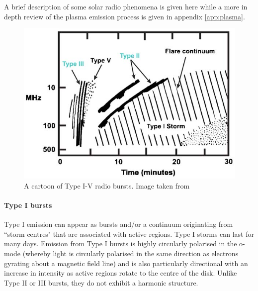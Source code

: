 
A brief description of some solar radio phenomena is given here while a more in depth review of the plasma emission process is given in appendix \ref{app:plasma}.
\begin{figure}
    \centering
    \includegraphics[width=0.75\columnwidth]{Images/Burst_cartoon.jpg}
    \caption[Cartoon of Type I-V radio bursts]{A cartoon of Type I-V radio bursts. Image taken from \cite{Cliver2009}}
    \label{fig:burst_cartoon}
\end{figure}
\paragraph{Type I bursts}
Type I emission can appear as bursts and/or a continuum originating from ``storm centres" that are associated with active regions. Type I storms can last for many days. Emission from Type I bursts is highly circularly polarised in the o-mode (whereby light is circularly polarised in the same direction as electrons gyrating about a magnetic field line) and is also particularly directional with an increase in intensity as active regions rotate to the centre of the disk. Unlike Type II or III bursts, they do not exhibit a harmonic structure.
